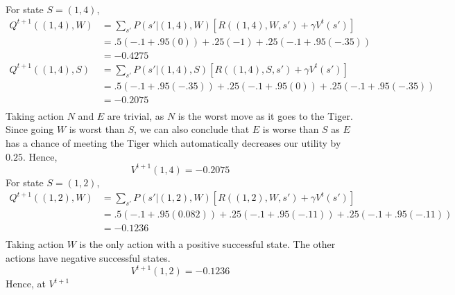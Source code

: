 \begin{enumerate}
$$        $$
        For state $S=(1,4)$,
        \begin{align*}
          Q^{t+1}((1,4), W) & =\sum_{s'}P(s'\vert (1,4), W)[R((1,4), W, s') + \gamma V^t(s')] \\
                            & =.5(-.1 + .95(0)) + .25(-1) + .25(-.1 + .95(-.35))              \\
                            & = -0.4275                                                       \\
          Q^{t+1}((1,4), S) & =\sum_{s'}P(s'\vert (1,4), S)[R((1,4), S, s') + \gamma V^t(s')] \\
                            & =.5(-.1 + .95(-.35)) + .25(-.1 + .95(0)) + .25(-.1 + .95(-.35)) \\
                            & = -0.2075                                                       \\
        \end{align*}
        Taking action $N$ and $E$ are trivial, as $N$ is the worst move as it goes to the Tiger. Since going $W$ is worst than $S$, we can also conclude that $E$ is worse than $S$ as $E$ has a chance of meeting the Tiger which automatically decreases our utility by $0.25$. Hence,
        $$
          V^{t+1}(1,4)= -0.2075
        $$
        For state $S=(1,2)$,
        \begin{align*}
          Q^{t+1}((1,2), W) & =\sum_{s'}P(s'\vert (1,2), W)[R((1,2), W, s') + \gamma V^t(s')]     \\
                            & =.5(-.1 + .95(0.082)) + .25(-.1 + .95(-.11)) + .25(-.1 + .95(-.11)) \\
                            & = -0.1236                                                           \\
        \end{align*}
        Taking action $W$ is the only action with a positive successful state. The other actions have negative successful states.
        $$
          V^{t+1}(1,2)= -0.1236
        $$
        Hence, at $V^{t+1}$
        \begin{center}


\end{center}
\end{enumerate}
